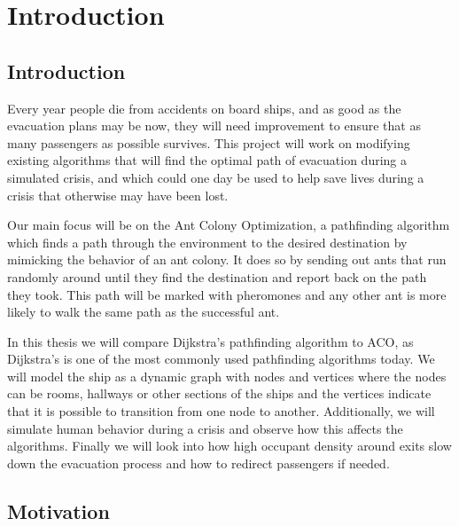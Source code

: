 \chapter{Introduction}
\label{ch:introduction}

\section{Introduction}

Every year people die from accidents on board ships, and as good as the evacuation plans may be now,
they will need improvement to ensure that as many passengers as possible survives. This project will work                            %
 on modifying existing algorithms that will find the optimal path of evacuation during a simulated crisis, and which could         %
 one day be used to help save lives during a crisis that otherwise may have been lost. 

Our main focus will be on the Ant Colony Optimization, a pathfinding algorithm which finds a path through
 the environment to the desired destination by mimicking the behavior of an ant colony. It does so by sending 
out ants that run randomly around until they find the destination and report back on the path they took.
 This path will be marked with pheromones and any other ant is more likely to walk the same path as the successful ant. 

In this thesis we will compare Dijkstra's pathfinding algorithm to ACO, as Dijkstra's is one of the most commonly
 used pathfinding algorithms today. We will model the ship as a dynamic graph with nodes and vertices where
 the nodes can be rooms, hallways or other sections of the ships and the vertices indicate that it is possible to
 transition from one node to another. Additionally, we will simulate human behavior during a crisis and observe
 how this affects the algorithms. Finally we will look into how high occupant density around exits slow down the 
evacuation process and how to redirect passengers if needed.

\section{Motivation}

